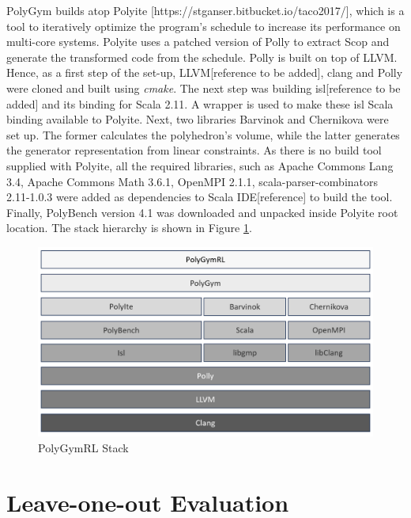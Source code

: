 \documentclass[logo,msc]{infthesis}           %
\begin{document}
PolyGym builds atop Polyite [https://stganser.bitbucket.io/taco2017/], which is a tool to iteratively optimize the program's schedule to increase its performance on multi-core systems. Polyite uses a patched version of Polly to extract Scop and generate the transformed code from the schedule. Polly is built on top of LLVM. Hence, as a first step of the set-up, LLVM[reference to be added], clang and Polly were cloned and built using \textit{cmake}. The next step was building isl[reference to be added] and its binding for Scala 2.11. A wrapper is used to make these isl Scala binding available to Polyite\cite{10.1145/3109482}. Next, two libraries Barvinok\cite{10.5555/261410.261418} and Chernikova\cite{leverge:inria-00074895} were set up. The former calculates the polyhedron's volume, while the latter generates the generator representation from linear constraints. As there is no build tool supplied with Polyite, all the required libraries, such as Apache Commons Lang 3.4, Apache Commons Math 3.6.1, OpenMPI 2.1.1\cite{OpenMPI}, scala-parser-combinators 2.11-1.0.3 were added as dependencies to Scala IDE[reference] to build the tool. Finally, PolyBench version 4.1 was downloaded and unpacked inside Polyite root location. The stack hierarchy is shown in Figure \ref{fig::stack}.

\begin{figure}[htbp]  
  \centering
  \includegraphics[width=\textwidth]{Images/PolyGymRlStack.png}    
  \caption{PolyGymRL Stack}
  \label{fig::stack}
\end{figure}



\section{Leave-one-out Evaluation}
\end{document}
